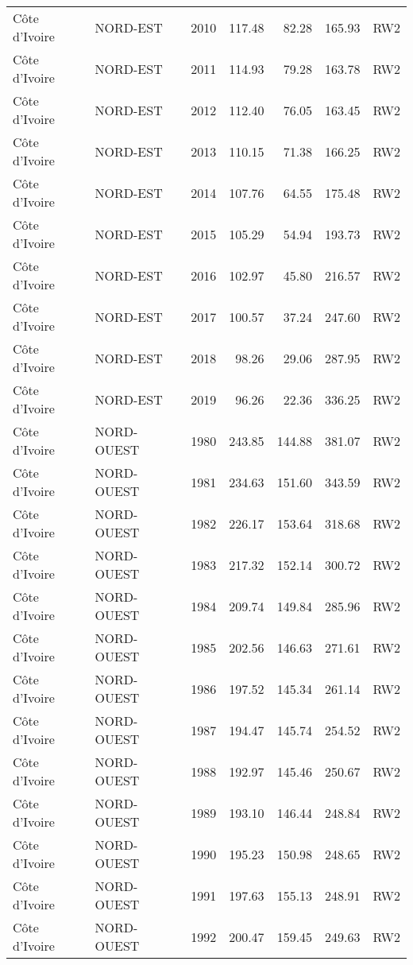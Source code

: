 \begin{longtable}{lllrrrl}
  C\^{o}te d'Ivoire & NORD-EST & 2010 & 117.48 & 82.28 & 165.93 & RW2 \\ 
  C\^{o}te d'Ivoire & NORD-EST & 2011 & 114.93 & 79.28 & 163.78 & RW2 \\ 
  C\^{o}te d'Ivoire & NORD-EST & 2012 & 112.40 & 76.05 & 163.45 & RW2 \\ 
  C\^{o}te d'Ivoire & NORD-EST & 2013 & 110.15 & 71.38 & 166.25 & RW2 \\ 
  C\^{o}te d'Ivoire & NORD-EST & 2014 & 107.76 & 64.55 & 175.48 & RW2 \\ 
  C\^{o}te d'Ivoire & NORD-EST & 2015 & 105.29 & 54.94 & 193.73 & RW2 \\ 
  C\^{o}te d'Ivoire & NORD-EST & 2016 & 102.97 & 45.80 & 216.57 & RW2 \\ 
  C\^{o}te d'Ivoire & NORD-EST & 2017 & 100.57 & 37.24 & 247.60 & RW2 \\ 
  C\^{o}te d'Ivoire & NORD-EST & 2018 & 98.26 & 29.06 & 287.95 & RW2 \\ 
  C\^{o}te d'Ivoire & NORD-EST & 2019 & 96.26 & 22.36 & 336.25 & RW2 \\ 
  C\^{o}te d'Ivoire & NORD-OUEST & 1980 & 243.85 & 144.88 & 381.07 & RW2 \\ 
  C\^{o}te d'Ivoire & NORD-OUEST & 1981 & 234.63 & 151.60 & 343.59 & RW2 \\ 
  C\^{o}te d'Ivoire & NORD-OUEST & 1982 & 226.17 & 153.64 & 318.68 & RW2 \\ 
  C\^{o}te d'Ivoire & NORD-OUEST & 1983 & 217.32 & 152.14 & 300.72 & RW2 \\ 
  C\^{o}te d'Ivoire & NORD-OUEST & 1984 & 209.74 & 149.84 & 285.96 & RW2 \\ 
  C\^{o}te d'Ivoire & NORD-OUEST & 1985 & 202.56 & 146.63 & 271.61 & RW2 \\ 
  C\^{o}te d'Ivoire & NORD-OUEST & 1986 & 197.52 & 145.34 & 261.14 & RW2 \\ 
  C\^{o}te d'Ivoire & NORD-OUEST & 1987 & 194.47 & 145.74 & 254.52 & RW2 \\ 
  C\^{o}te d'Ivoire & NORD-OUEST & 1988 & 192.97 & 145.46 & 250.67 & RW2 \\ 
  C\^{o}te d'Ivoire & NORD-OUEST & 1989 & 193.10 & 146.44 & 248.84 & RW2 \\ 
  C\^{o}te d'Ivoire & NORD-OUEST & 1990 & 195.23 & 150.98 & 248.65 & RW2 \\ 
  C\^{o}te d'Ivoire & NORD-OUEST & 1991 & 197.63 & 155.13 & 248.91 & RW2 \\ 
  C\^{o}te d'Ivoire & NORD-OUEST & 1992 & 200.47 & 159.45 & 249.63 & RW2 \\ 

\end{longtable}
